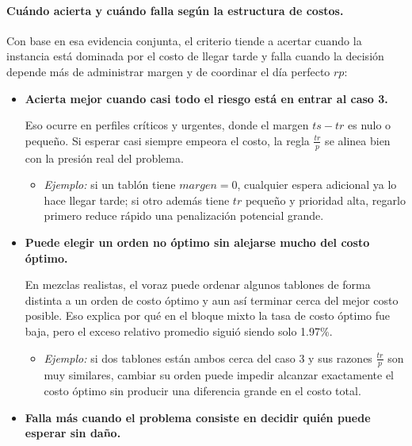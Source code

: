 \documentclass[12pt,a4paper]{article}
\begin{document}
\paragraph{Cu\'ando acierta y cu\'ando falla seg\'un la estructura de costos.}
Con base en esa evidencia conjunta, el criterio tiende a acertar cuando la instancia est\'a dominada por el costo de llegar tarde y falla cuando la decisi\'on depende m\'as de administrar margen y de coordinar el d\'ia perfecto \(rp\):

\begin{itemize}
  \setlength{\itemsep}{0.7em}
  \item \textbf{Acierta mejor cuando casi todo el riesgo est\'a en entrar al caso 3.}

  Eso ocurre en perfiles cr\'iticos y urgentes, donde el margen \(ts-tr\) es nulo o peque\~no. Si esperar casi siempre empeora el costo, la regla \(\frac{tr}{p}\) se alinea bien con la presi\'on real del problema.

  \begin{itemize}
    \setlength{\itemsep}{0.2em}
    \item \textit{Ejemplo:} si un tabl\'on tiene \(margen=0\), cualquier espera adicional ya lo hace llegar tarde; si otro adem\'as tiene \(tr\) peque\~no y prioridad alta, regarlo primero reduce r\'apido una penalizaci\'on potencial grande.
  \end{itemize}

  \item \textbf{Puede elegir un orden no \'optimo sin alejarse mucho del costo \'optimo.}

  En mezclas realistas, el voraz puede ordenar algunos tablones de forma distinta a un orden de costo \'optimo y aun as\'i terminar cerca del mejor costo posible. Eso explica por qu\'e en el bloque mixto la tasa de costo \'optimo fue baja, pero el exceso relativo promedio sigui\'o siendo solo 1.97\%.

  \begin{itemize}
    \setlength{\itemsep}{0.2em}
    \item \textit{Ejemplo:} si dos tablones est\'an ambos cerca del caso 3 y sus razones \(\frac{tr}{p}\) son muy similares, cambiar su orden puede impedir alcanzar exactamente el costo \'optimo sin producir una diferencia grande en el costo total.
  \end{itemize}

  \item \textbf{Falla m\'as cuando el problema consiste en decidir qui\'en puede esperar sin da\~no.}


\end{itemize}
\end{document}
